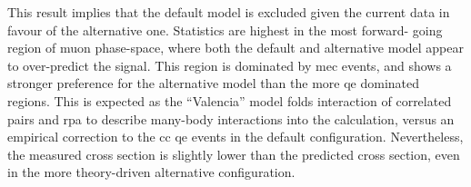 This result implies that the \g default model is excluded given the current data in favour of the alternative one. 
Statistics are highest in the most forward- going region of muon phase-space, where both the default and alternative model appear to over-predict the signal. This region is dominated by \acrshort{mec} events, and shows a stronger preference for the alternative model than the more \acrshort{qe} dominated regions. This is expected as the ``Valencia'' model folds interaction of correlated pairs and \acrshort{rpa} to describe many-body interactions into the calculation, versus an empirical correction to the \acrshort{cc} \acrshort{qe} events in the default configuration. Nevertheless, the measured cross section is slightly lower than the predicted \g cross section, even in the more theory-driven alternative \g configuration.












